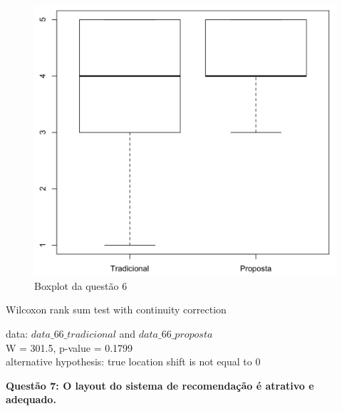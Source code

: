 \begin{figure}[htb]
  \caption{\label{fig:questao6-boxplot}Boxplot da questão 6}
  \begin{center}
      \includegraphics[scale=0.6]{./Figuras/questao6-boxplot.png}
  \end{center}
\end{figure}

Wilcoxon rank sum test with continuity correction

data:  $data\_66\_tradicional$ and $data\_66\_proposta$\\
W = 301.5, p-value = 0.1799\\
alternative hypothesis: true location shift is not equal to 0

\newpage
\textbf{Questão 7: O layout do sistema de recomendação é atrativo e adequado.}

